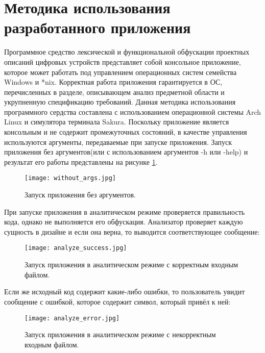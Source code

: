 \section{Методика использования разработанного приложения}
\label{sec:usage}
Программное средство лексической и функциональной обфускации проектных описаний цифровых устройств представляет собой консольное приложение, которое может работать под управлением операционных систем семейства Windows и *nix. Корректная работа приложения гарантируется в ОС, перечисленных в разделе, описывающем анализ предметной области и укрупненную спецификацию требований. Данная методика использования программного сердства составлена с использованием операционной системы Arch Linux и симулятора терминала Sakura. Поскольку приложение является консольным и не содержит промежуточных состояний, в качестве управления используются аргументы, передаваемые при запуске приложения. Запуск приложения без аргументов(или с использованием аргументов -h или -help) и результат его работы представлены на рисунке \ref{fig:sec:usage:without_args}.

\begin{landscape}
\thispagestyle{lscape}
\begin{figure}[ht]
\centering
  \texttt{[image: without\_args.jpg]}
  \caption{ Запуск приложения без аргументов. }
  \label{fig:sec:usage:without_args}
\end{figure}
\end{landscape}

При запуске приложения в аналитическом режиме проверяется правильность кода, однако не выполняется его обфускация. Анализатор проверяет каждую сущность в дизайне и если она верна, то выводится соответствующее сообщение:

\begin{figure}[ht]
\centering
  \texttt{[image: analyze\_success.jpg]}
  \caption{ Запуск приложения в аналитическом режиме с корректным входным файлом. }
  \label{fig:sec:usage:analyze_success}
\end{figure}

Если же исходный код содержит какие-либо ошибки, то пользователь увидит сообщение с ошибкой, которое содержит символ, который привёл к ней:


\begin{figure}[ht]
\centering
  \texttt{[image: analyze\_error.jpg]}
  \caption{ Запуск приложения в аналитическом режиме с некорректным входным файлом. }
  \label{fig:sec:usage:analyze_error}
\end{figure}

